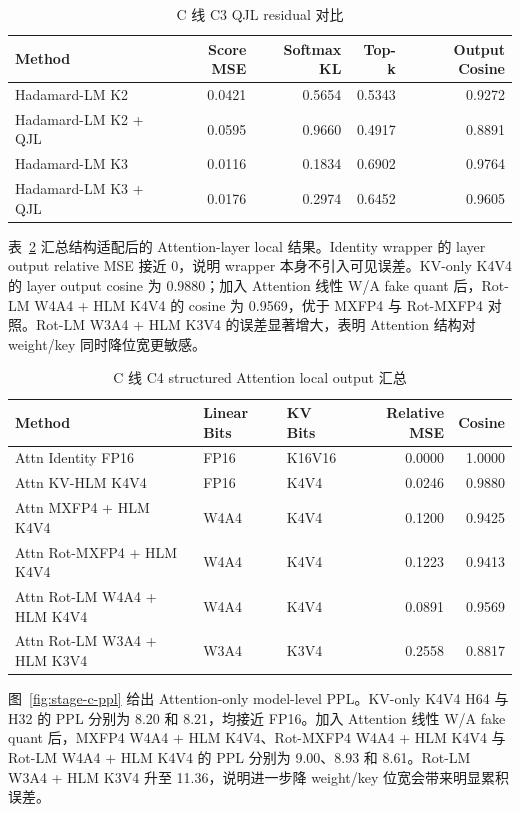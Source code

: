 \documentclass[lang=cn,chinesefont=nofont,a4paper,newtx]{elegantpaper}
\begin{document}
\begin{table}[!htbp]
  \centering
  \caption{C 线 C3 QJL residual 对比}
  \label{tab:stage-c-qjl}
  \footnotesize
  \begin{tabular}{lrrrr}
    \toprule
    Method & Score MSE & Softmax KL & Top-k & Output Cosine \\
    \midrule
    Hadamard-LM K2 & 0.0421 & 0.5654 & 0.5343 & 0.9272 \\
    Hadamard-LM K2 + QJL & 0.0595 & 0.9660 & 0.4917 & 0.8891 \\
    Hadamard-LM K3 & 0.0116 & 0.1834 & 0.6902 & 0.9764 \\
    Hadamard-LM K3 + QJL & 0.0176 & 0.2974 & 0.6452 & 0.9605 \\
    \bottomrule
  \end{tabular}
\end{table}

表~\ref{tab:stage-c-attention-local} 汇总结构适配后的 Attention-layer local 结果。Identity wrapper 的 layer output relative MSE 接近 0，说明 wrapper 本身不引入可见误差。KV-only K4V4 的 layer output cosine 为 0.9880；加入 Attention 线性 W/A fake quant 后，Rot-LM W4A4 + HLM K4V4 的 cosine 为 0.9569，优于 MXFP4 与 Rot-MXFP4 对照。Rot-LM W3A4 + HLM K3V4 的误差显著增大，表明 Attention 结构对 weight/key 同时降位宽更敏感。

\begin{table}[!htbp]
  \centering
  \caption{C 线 C4 structured Attention local output 汇总}
  \label{tab:stage-c-attention-local}
  \footnotesize
  \begin{tabular}{lllrr}
    \toprule
    Method & Linear Bits & KV Bits & Relative MSE & Cosine \\
    \midrule
    Attn Identity FP16 & FP16 & K16V16 & 0.0000 & 1.0000 \\
    Attn KV-HLM K4V4 & FP16 & K4V4 & 0.0246 & 0.9880 \\
    Attn MXFP4 + HLM K4V4 & W4A4 & K4V4 & 0.1200 & 0.9425 \\
    Attn Rot-MXFP4 + HLM K4V4 & W4A4 & K4V4 & 0.1223 & 0.9413 \\
    Attn Rot-LM W4A4 + HLM K4V4 & W4A4 & K4V4 & 0.0891 & 0.9569 \\
    Attn Rot-LM W3A4 + HLM K3V4 & W3A4 & K3V4 & 0.2558 & 0.8817 \\
    \bottomrule
  \end{tabular}
\end{table}

图~\ref{fig:stage-c-ppl} 给出 Attention-only model-level PPL。KV-only K4V4 H64 与 H32 的 PPL 分别为 8.20 和 8.21，均接近 FP16。加入 Attention 线性 W/A fake quant 后，MXFP4 W4A4 + HLM K4V4、Rot-MXFP4 W4A4 + HLM K4V4 与 Rot-LM W4A4 + HLM K4V4 的 PPL 分别为 9.00、8.93 和 8.61。Rot-LM W3A4 + HLM K3V4 升至 11.36，说明进一步降 weight/key 位宽会带来明显累积误差。
\end{document}
